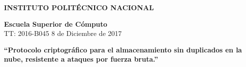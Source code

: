 \documentclass[12pt,oneside,onecolumn]{book}
\begin{document}
\begin{titlepage}
{	    {\fontsize{19}{30} \textbf{  INSTITUTO POLIT\'ECNICO NACIONAL}}
	    \begin{center}
	    {\fontsize{16}{20} \textbf{Escuela Superior de C\'omputo}}\vspace{1cm}\\
   { \fontsize{14}{20} TT: 2016-B045 \hspace{6.5cm} 8 de Diciembre de 2017}\vspace{2cm}
	
	    {\fontsize{16}{20} \textbf{``Protocolo criptográfico para el almacenamiento sin duplicados en la nube, resistente a ataques por fuerza bruta.''}}\vspace{1cm}\\
	    

\end{center}}
\end{titlepage}
\end{document}
